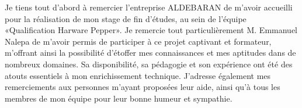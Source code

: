 Je tiens tout d’abord à remercier l’entreprise ALDEBARAN de m’avoir accueilli pour la réalisation de mon stage de fin d'études, au sein de l'équipe «Qualification Harware Pepper».
Je remercie tout particulièrement M. Emmanuel Nalepa de m'avoir permis de participer à ce projet captivant et formateur, m’offrant ainsi la possibilité d'étoffer mes connaissances et mes aptitudes dans de nombreux domaines. Sa disponibilité, sa pédagogie et son expérience ont été des atouts essentiels à mon enrichissement technique.
J’adresse également mes remerciements aux personnes m'ayant proposées leur aide, ainsi qu'à tous les membres de mon équipe pour leur bonne humeur et sympathie.